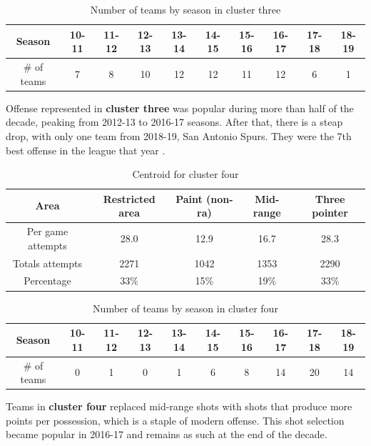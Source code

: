 \documentclass[a4paper]{article}
\begin{document}
\begin{table}[!h]
\begin{tabular}{|c|c|c|c|c|c|c|c|c|c|} \hline
Season & 10-11 & 11-12 & 12-13 & 13-14 & 14-15 & 15-16 & 16-17 & 17-18 & 18-19 \\ \hline
\# of teams & 7 & 8 & 10 & 12 & 12 & 11 & 12 & 6 & 1 \\ \hline
\end{tabular}
\caption{Number of teams by season in cluster three}
\label{tab:clust_shooting_by_teams_num3}
\end{table}

Offense represented in \textbf{cluster three} was popular during more than half of the decade, peaking from 2012-13 to 2016-17 seasons. After that, there is a steap drop, with only one team from 2018-19, San Antonio Spurs. They were the 7th best offense in the league that year .

\begin{table}[!h]
\begin{center}
\begin{tabular}{|c|c|c|c|c|} \hline
Area & Restricted area & Paint (non-ra) & Mid-range & Three pointer \\ \hline
Per game attempts & 28.0 & 12.9 & 16.7 & 28.3  \\ \hline
Totals attempts & 2271 & 1042 & 1353 & 2290  \\ \hline
Percentage & 33\% & 15\% & 19\% & 33\% \\ \hline
\end{tabular}
\caption{Centroid for cluster four}
\label{tab:clust_shooting_by_teams_centr4}
\end{center}
\end{table}

\begin{table}[!h]
\begin{tabular}{|c|c|c|c|c|c|c|c|c|c|} \hline
Season & 10-11 & 11-12 & 12-13 & 13-14 & 14-15 & 15-16 & 16-17 & 17-18 & 18-19 \\ \hline
\# of teams & 0 & 1 & 0 & 1 & 6 & 8 & 14 & 20 & 14 \\ \hline
\end{tabular}
\caption{Number of teams by season in cluster four}
\label{tab:clust_shooting_by_teams_num4}
\end{table}

Teams in \textbf{cluster four} replaced mid-range shots with shots that produce more points per possession, which is a staple of modern offense. This shot selection became popular in 2016-17 and remains as such at the end of the decade.
\end{document}

